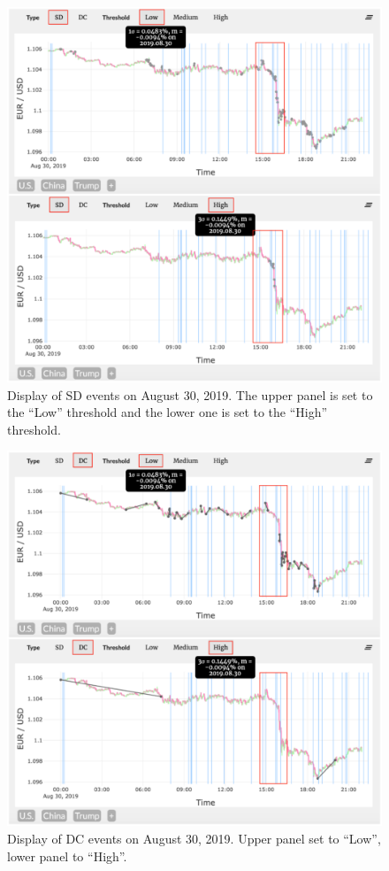 \documentclass[sigconf]{acmart}
\begin{document}
\begin{figure}[h]
  \centering
  \includegraphics[width=\linewidth]{sd.pdf}
  \caption{Display of SD events on August 30, 2019. The upper panel
  is set to the ``Low'' threshold and the lower one is set to the ``High''
  threshold.}
  \Description{}
  \label{fig:SD}
\end{figure}

\begin{figure}[h]
  \centering
  \includegraphics[width=\linewidth]{dc.pdf}
  \caption{Display of DC events on August 30, 2019. Upper panel
  set to ``Low'', lower panel to ``High''.}
  \Description{}
  \label{fig:DC}
\end{figure}
\end{document}
